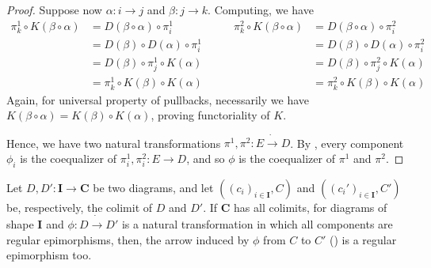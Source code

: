 \documentclass[runningheads,envcountsect]{llncs}
\newcommand{\cat}[1]{\ensuremath{\mathbf{#1}}}
\begin{document}
\begin{proof}
        Suppose now $\alpha : i \to j$ and $\beta: j \to k$. Computing, we have
        \[
            \begin{split}
                \pi_k^1 \circ K(\beta \circ \alpha) &= D(\beta \circ \alpha) \circ \pi_i^1 \\
                                                    &= D(\beta) \circ D(\alpha) \circ \pi_i^1 \\
                                                    &= D(\beta) \circ \pi_j^1 \circ K(\alpha) \\
                                                    &= \pi_k^1 \circ K(\beta) \circ K(\alpha)
            \end{split} \qquad
            \begin{split}
                \pi_k^2 \circ K(\beta \circ \alpha) &= D(\beta \circ \alpha) \circ \pi_i^2 \\
                                                    &= D(\beta) \circ D(\alpha) \circ \pi_i^2 \\
                                                    &= D(\beta) \circ \pi_j^2 \circ K(\alpha) \\
                                                    &= \pi_k^2 \circ K(\beta) \circ K(\alpha)
            \end{split}
        \]
        Again, for universal property of pullbacks, necessarily we have $K(\beta \circ \alpha) = K(\beta) \circ K(\alpha)$, proving functoriality of $K$.
   
    
     Hence, we have two natural transformations $\pi^1, \pi^2 : E \dot\to D$. By , every component $\phi_i$ is the coequalizer of $\pi_i^1, \pi_i^2: E \to D$, and so $\phi$ is the coequalizer of $\pi^1$ and $\pi^2$.
\end{proof}

\begin{lemma}\label{lemma:nat_trans_reg_epi_canonical_arrow_reg_epi}
    Let $D, D': \cat{I \to C}$ be two diagrams, and let $((c_i)_{i \in \cat I}, C)$ and $((c_i')_{i\in \cat I}, C')$ be, respectively, the colimit of $D$ and $D'$. If $\cat C$ has all colimits, for diagrams of shape $\cat I$ and $\phi: D \dot\to D'$ is a natural transformation in which all components are regular epimorphisms, then, the arrow induced by $\phi$ from $C$ to $C'$ () is a regular epimorphism too.
\end{lemma}
\end{document}
